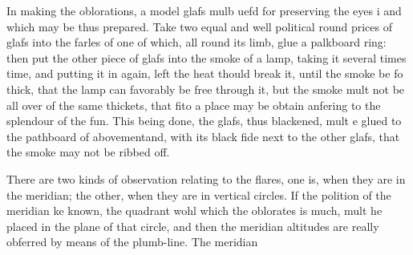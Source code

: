 In making the oblorations, a model glafs mulb uefd for preserving the eyes i and which may be thus prepared. Take two equal and well political round prices of glafs into the farles of one of which, all round its limb, glue a palkboard ring: then put the other piece of glafs into the smoke of a lamp, taking it several times time, and putting it in again, left the heat thould break it, until the smoke be fo thick, that the lamp can favorably be free through it, but the smoke mult not be all over of the same thickets, that fito a place may be obtain anfering to the splendour of the fun. This being done, the glafs, thus blackened, mult e glued to the pathboard of abovementand, with its black fide next to the other glafs, that the smoke may not be ribbed off.\par\medskip
There are two kinds of observation relating to the flares, one is, when they are in the meridian; the other, when they are in vertical circles. If the polition of the meridian ke known, the quadrant wohl which the oblorates is much, mult he placed in the plane of that circle, and then the meridian altitudes are really obferred by means of the plumb-line. The meridian\par\medskip
